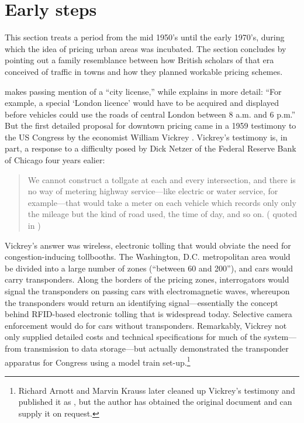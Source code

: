 \section{Early steps}

This section treats a period from the mid 1950's until the early 1970's, during which the idea of pricing urban areas was incubated. The section concludes by pointing out a family resemblance between how British scholars of that era conceived of traffic in towns and how they planned workable pricing schemes.

\citet{buchanan1952} makes passing mention of a ``city license,'' while \citet{Walters1954} explains in more detail: ``For example, a special `London licence' would have to be acquired and displayed before vehicles could use the roads of central London between 8 a.m. and 6 p.m.'' But the first detailed proposal for downtown pricing came in a 1959 testimony to the US Congress by the economist William Vickrey \citep{Vickrey1959}. Vickrey's testimony is, in part, a response to a difficulty posed by Dick Netzer of the Federal Reserve Bank of Chicago four years ealier:
\begin{quote}
 We cannot construct a tollgate at each and every intersection, and there is no way of metering highway service---like electric or water service, for example---that would take a meter on each vehicle which records only only the mileage but the kind of road used, the time of day, and so on. (\citet{Netzer1955} quoted in \citet{Vickrey1959})
\end{quote}

Vickrey's answer was wireless, electronic tolling that would obviate the need for congestion-inducing tollbooths. The Washington, D.C. metropolitan area would be divided into a large number of zones (``between 60 and 200''), and cars would carry transponders. Along the borders of the pricing zones, interrogators would signal the transponders on passing cars with electromagnetic waves, whereupon the transponders would return an identifying signal---essentially the concept behind RFID-based electronic tolling that is widespread today. Selective camera enforcement would do for cars without transponders. Remarkably, Vickrey not only supplied detailed costs and technical specifications for much of the system---from transmission to data storage---but actually demonstrated the transponder apparatus for Congress using a model train set-up.\footnote{Richard Arnott and Marvin Krauss later cleaned up Vickrey's testimony and published it as \citet{Vickrey1994}, but the author has obtained the original document and can supply it on request.} 


